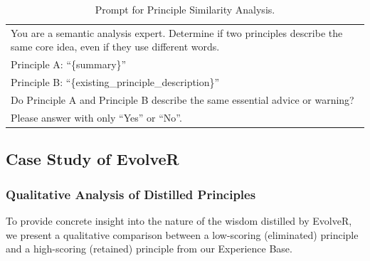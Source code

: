 \begin{table}[ht]
  \centering
  \small
  \label{tab:match_principle_prompt}
  \caption{Prompt for Principle Similarity Analysis.}
  \begin{tabular}{p{}}
    \toprule
You are a semantic analysis expert. Determine if two principles describe the same core idea, even if they use different words.\\[0.5em]

Principle A: ``\{summary\}''\\
Principle B: ``\{existing\_principle\_description\}''\\[0.5em]

Do Principle A and Principle B describe the same essential advice or warning?\\
Please answer with only ``Yes'' or ``No''.\\
    \bottomrule
  \end{tabular}
\end{table}


\subsection{Case Study of EvolveR}

\subsubsection{Qualitative Analysis of Distilled Principles}
To provide concrete insight into the nature of the wisdom distilled by EvolveR, we present a qualitative comparison between a low-scoring (eliminated) principle and a high-scoring (retained) principle from our Experience Base.

